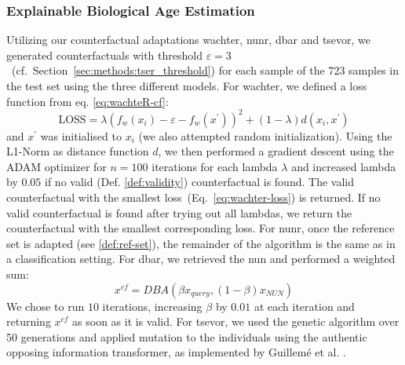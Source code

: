 \subsubsection{Explainable Biological Age Estimation}
Utilizing our counterfactual adaptations \gls{wachter}, \gls{nunr}, \gls{dbar} and \gls{tsevor}, we generated counterfactuals with threshold $\varepsilon=3$~(cf.~Section~\ref{sec:methods:tser_threshold}) for each sample of the 723 samples in the test set using the three different models.
For \gls{wachter}, we defined a loss function from eq. \ref{eq:wachteR-cf}:
\begin{equation}
    \label{eq:wachter-loss}
    \text{LOSS} = \lambda\left(f_{w}\left(x_{i}\right)-\varepsilon -f_{w}\left(x^{\prime}\right)\right)^{2}+\left(1-\lambda\right)d\left(x_{i}, x^{\prime}\right)
\end{equation}
and $x^{\prime}$ was initialised  to $x_{i}$ (we also attempted random initialization). 
Using the L1-Norm as distance function $d$, we then performed a gradient descent using the ADAM \cite{kingma_adam_2017} optimizer for $n=100$ iterations for each lambda $\lambda$ and increased lambda by $0.05$ if no valid (Def. \ref{def:validity}) counterfactual is found. The valid counterfactual with the smallest loss~(Eq.~\ref{eq:wachter-loss}) is returned. If no valid counterfactual is found after trying out all lambdas, we return the counterfactual with the smallest corresponding loss.
For \gls{nunr}, once the reference set is adapted (see \ref{def:ref-set}), the remainder of the algorithm is the same as in a classification setting.
For \gls{dbar}, we retrieved the \gls{nun} and performed a weighted sum: 
\begin{equation}
    x^{cf} = DBA(\beta x_{query}, (1-\beta)x_{NUN})
\end{equation}
We chose to run $10$ iterations, increasing $\beta$ by $0.01$ at each iteration and returning $x^{cf}$ as soon as it is valid. 
For \gls{tsevor}, we used the genetic algorithm over 50 generations and applied mutation to the individuals using the authentic opposing information transformer, as implemented by Guillemé et al. \cite{guilleme_agnostic_2019}.

